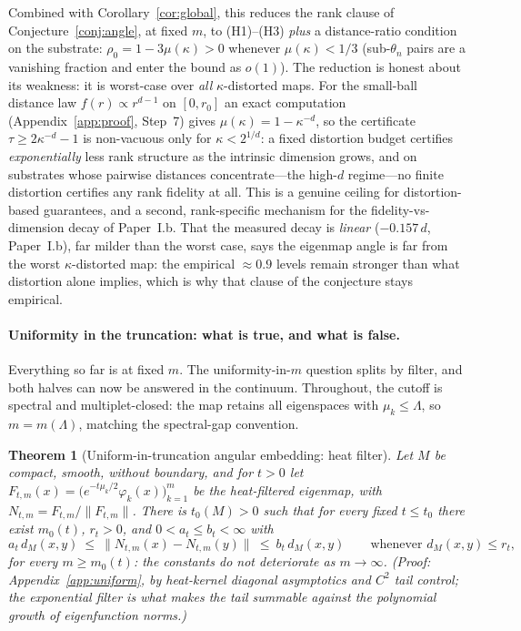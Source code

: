 \documentclass[11pt]{article}
\newtheorem{theorem}{Theorem}
\theoremstyle{remark}
\begin{document}
Combined with Corollary~\ref{cor:global}, this reduces the rank clause of
Conjecture~\ref{conj:angle}, at fixed $m$, to (H1)--(H3) \emph{plus} a
distance-ratio condition on the substrate: $\rho_0=1-3\mu(\kappa)>0$ whenever
$\mu(\kappa)<1/3$ (sub-$\theta_n$ pairs are a vanishing fraction and enter the
bound as $o(1)$). The reduction is honest about its weakness: it is worst-case
over \emph{all} $\kappa$-distorted maps. For the small-ball distance law
$f(r)\propto r^{d-1}$ on $[0,r_0]$ an exact computation
(Appendix~\ref{app:proof}, Step~7) gives $\mu(\kappa)=1-\kappa^{-d}$, so the
certificate $\tau\ge2\kappa^{-d}-1$ is non-vacuous only for $\kappa<2^{1/d}$:
a fixed distortion budget certifies \emph{exponentially} less rank structure
as the intrinsic dimension grows, and on substrates whose pairwise distances
concentrate---the high-$d$ regime---no finite distortion certifies any rank
fidelity at all. This is a genuine ceiling for distortion-based guarantees,
and a second, rank-specific mechanism for the fidelity-vs-dimension decay of
Paper~I.b. That the measured decay is \emph{linear} ($-0.157\,d$,
Paper~I.b), far milder than the worst case, says the eigenmap angle is
far from the worst $\kappa$-distorted map: the empirical $\approx0.9$ levels
remain stronger than what distortion alone implies, which is why that clause
of the conjecture stays empirical.

\paragraph{Uniformity in the truncation: what is true, and what is false.}
Everything so far is at fixed $m$. The uniformity-in-$m$ question splits by
filter, and both halves can now be answered in the continuum. Throughout, the
cutoff is spectral and multiplet-closed: the map retains all eigenspaces with
$\mu_k\le\Lambda$, so $m=m(\Lambda)$, matching the spectral-gap convention.

\begin{theorem}[Uniform-in-truncation angular embedding: heat filter]\label{thm:heat}
Let $M$ be compact, smooth, without boundary, and for $t>0$ let
$F_{t,m}(x)=\big(e^{-t\mu_k/2}\varphi_k(x)\big)_{k=1}^{m}$ be the heat-filtered
eigenmap, with $N_{t,m}=F_{t,m}/\lVert F_{t,m}\rVert$. There is $t_0(M)>0$ such
that for every fixed $t\le t_0$ there exist $m_0(t)$, $r_t>0$, and
$0<a_t\le b_t<\infty$ with
\[
a_t\,d_M(x,y)\ \le\ \lVert N_{t,m}(x)-N_{t,m}(y)\rVert\ \le\ b_t\,d_M(x,y)
\qquad\text{whenever }d_M(x,y)\le r_t,
\]
for \emph{every} $m\ge m_0(t)$: the constants do not deteriorate as
$m\to\infty$. (Proof: Appendix~\ref{app:uniform}, by heat-kernel diagonal
asymptotics and $C^2$ tail control; the exponential filter is what makes the
tail summable against the polynomial growth of eigenfunction norms.)
\end{theorem}
\end{document}
